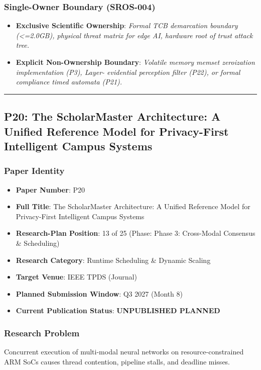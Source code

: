 \documentclass[11pt,letterpaper]{article}
\begin{document}
\subsubsection{Single-Owner Boundary (SROS-004)}
\begin{itemize}[leftmargin=*]
    \item \textbf{Exclusive Scientific Ownership}: \textit{Formal TCB demarcation boundary (<=2.0GB), physical threat matrix for edge AI, hardware root of trust attack tree.}
    \item \textbf{Explicit Non-Ownership Boundary}: \textit{Volatile memory memset zeroization implementation (P3), Layer- evidential perception filter (P22), or formal compliance timed automata (P21).}
\end{itemize}

\vspace{0.4cm}
\hrule

\subsection{P20: The ScholarMaster Architecture: A Unified Reference Model for Privacy-\allowbreak First Intelligent Campus Systems}
\label{sec:profile_p20}

\subsubsection{Paper Identity}
\begin{itemize}[leftmargin=*]
    \item \textbf{Paper Number}: P20
    \item \textbf{Full Title}: The ScholarMaster Architecture: A Unified Reference Model for Privacy-\allowbreak First Intelligent Campus Systems
    \item \textbf{Research-Plan Position}: 13 of 25 (Phase: Phase 3: Cross-\allowbreak Modal Consensus \& Scheduling)
    \item \textbf{Research Category}: Runtime Scheduling \& Dynamic Scaling
    \item \textbf{Target Venue}: IEEE TPDS (Journal)
    \item \textbf{Planned Submission Window}: Q3 2027 (Month 8)
    \item \textbf{Current Publication Status}: \textbf{UNPUBLISHED PLANNED}
\end{itemize}

\subsubsection{Research Problem}
Concurrent execution of multi-\allowbreak modal neural networks on resource-\allowbreak constrained ARM SoCs causes thread contention, pipeline stalls, and deadline misses.
\end{document}
